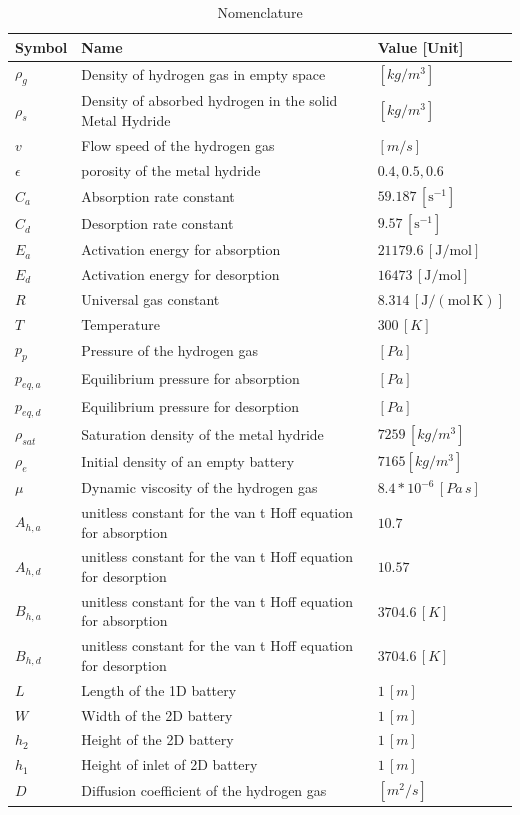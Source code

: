 \begin{table}[ht]
    \centering
    \caption{Nomenclature}
    \label{tab:nomenclature}
    \begin{tabular}{lll}
        \hline
        \textbf{Symbol} & \textbf{Name} & \textbf{Value [Unit]} \\
        \hline
        $\rho_g$ & Density of hydrogen gas in empty space & $[kg/m^3]$\\
        $\rho_s$ & Density of absorbed hydrogen in the solid Metal Hydride & $[kg/m^3]$\\
        $v$ & Flow speed of the hydrogen gas & $[m/s]$\\
        $\epsilon$ & porosity of the metal hydride & $0.4, 0.5, 0.6$ \\
        $C_a$ & Absorption rate constant & $59.187 \, [\mathrm{s^{-1}}]$\\
        $C_d$ & Desorption rate constant & $9.57 \, [\mathrm{s^{-1}}]$\\
        $E_a$ & Activation energy for absorption & $21179.6 \, [\mathrm{J/mol}]$\\
        $E_d$ & Activation energy for desorption & $16473 \, [\mathrm{J/mol}]$\\
        $R$ & Universal gas constant & $8.314 \, [\mathrm{J/(mol \, K)}]$\\
        $T$ & Temperature & $300 \, [K]$\\
        $p_p$ & Pressure of the hydrogen gas & $[Pa]$\\
        $p_{eq,a}$ & Equilibrium pressure for absorption & $[Pa]$\\
        $p_{eq,d}$ & Equilibrium pressure for desorption & $[Pa]$\\
        $\rho_{sat}$ & Saturation density of the metal hydride & $7259\,[kg/m^3]$\\
        $\rho_e$ & Initial density of an empty battery & $7165[kg/m^3]$\\
        $\mu$ & Dynamic viscosity of the hydrogen gas & $8.4*10^{-6} \, [Pa \, s]$\\
        $A_{h,a}$ & unitless constant for the van t Hoff equation for absorption & $10.7$\\
        $A_{h,d}$ & unitless constant for the van t Hoff equation for desorption & $10.57$\\
        $B_{h,a}$ & unitless constant for the van t Hoff equation for absorption & $3704.6 \, [K]$\\
        $B_{h,d}$ & unitless constant for the van t Hoff equation for desorption & $3704.6 \, [K]$\\
        $L$ & Length of the 1D battery & $1\,[m]$\\
        $W$ & Width of the 2D battery & $1\,[m]$\\
        $h_2$ & Height of the 2D battery & $1\,[m]$\\
        $h_1$ & Height of inlet of 2D battery & $1\,[m]$\\
        $D$ & Diffusion coefficient of the hydrogen gas & $[m^2/s]$\\

        \hline
    \end{tabular}
\end{table}


